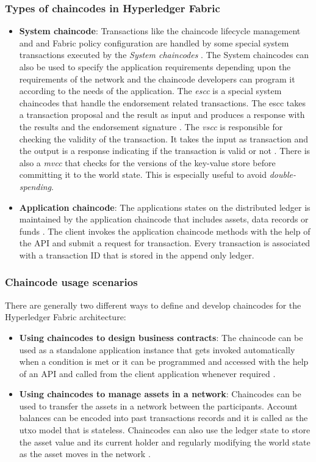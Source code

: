 \documentclass[
  a4paper,  %
  twoside,  %
  bibliography=totoc,
  headsepline,
  cleardoublepage=empty,
  parskip=half,
  draft=false
]{scrbook}
\begin{document}
\subsubsection{Types of chaincodes in Hyperledger Fabric}
\begin{itemize}
    \item \textbf{System chaincode}: Transactions like the chaincode lifecycle management and and Fabric policy configuration are handled by some special system transactions executed by the \textit{System chaincodes} \cite{HW2}. The System chaincodes can also be used to specify the application requirements depending upon the requirements of the network and the chaincode developers can program it according to the needs of the application. The \textit{\gls{escc}} is a special system chaincodes that handle the endorsement related transactions. The \gls{escc} takes a transaction proposal and the result as input and produces a response with the results and the endorsement signature \cite{HF}. The \textit{\gls{vscc}} is responsible for checking the validity of the transaction. It takes the input as transaction and the output is a response indicating if the transaction is valid or not \cite{HF}. There is also a \textit{\gls{mvcc}} that checks for the versions of the key-value store before committing it to the world state. This is especially useful to avoid \textit{double-spending}.
    \item \textbf{Application chaincode}: The applications states on the distributed ledger is maintained by the application chaincode that includes assets, data records or funds \cite{HW2}. The client invokes the application chaincode methods with the help of the API and submit a request for transaction. Every transaction is associated with a transaction ID that is stored in the append only ledger.
\end{itemize}

\subsubsection{Chaincode usage scenarios}
There are generally two different ways to define and develop chaincodes for the Hyperledger Fabric architecture:
\begin{itemize}
    \item \textbf{Using chaincodes to design business contracts}: The chaincode can be used as a standalone application instance that gets invoked automatically when a condition is met or it can be programmed and accessed with the help of an API and called from the client application whenever required \cite{HW2}.
    \item \textbf{Using chaincodes to manage assets in a network}: Chaincodes can be used to transfer the assets in a network between the participants. Account balances can be encoded into past transactions records and it is called as the \gls{utxo} model that is stateless. Chaincodes can also use the ledger state to store the asset value and its current holder and regularly modifying the world state as the asset moves in the network \cite{HW2}.
\end{itemize}
\end{document}
